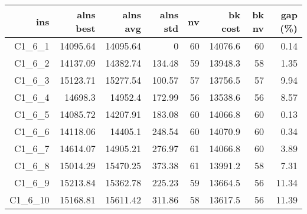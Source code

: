   \begin{table}[caption={Kết quả đo với tập HG\_C\_1\_6 600 yêu cầu}, label=exp:HGC16]
    \centering
    \begin{tabular}{rrrrrrrr}
    \hline
    ins & alns best & alns avg & alns std & nv & bk cost & bk nv & gap (\%) \\ \hline
    C1\_6\_1 & 14095.64 & 14095.64 & 0 & 60 & 14076.6 & 60 & 0.14 \\ \hline
    C1\_6\_2 & 14137.09 & 14382.74 & 134.48 & 59 & 13948.3 & 58 & 1.35 \\ \hline
    C1\_6\_3 & 15123.71 & 15277.54 & 100.57 & 57 & 13756.5 & 57 & 9.94 \\ \hline
    C1\_6\_4 & 14698.3 & 14952.4 & 172.99 & 56 & 13538.6 & 56 & 8.57 \\ \hline
    C1\_6\_5 & 14085.72 & 14207.91 & 183.08 & 60 & 14066.8 & 60 & 0.13 \\ \hline
    C1\_6\_6 & 14118.06 & 14405.1 & 248.54 & 60 & 14070.9 & 60 & 0.34 \\ \hline
    C1\_6\_7 & 14614.07 & 14905.21 & 276.97 & 61 & 14066.8 & 60 & 3.89 \\ \hline
    C1\_6\_8 & 15014.29 & 15470.25 & 373.38 & 61 & 13991.2 & 58 & 7.31 \\ \hline
    C1\_6\_9 & 15213.84 & 15362.78 & 225.23 & 59 & 13664.5 & 56 & 11.34 \\ \hline
    C1\_6\_10 & 15168.81 & 15611.42 & 311.86 & 58 & 13617.5 & 56 & 11.39 \\ \hline
    \end{tabular}
  \end{table}

